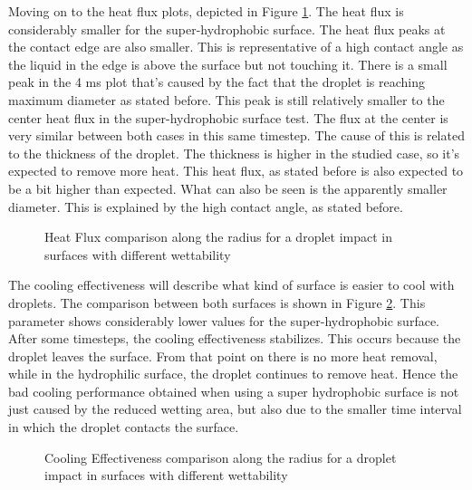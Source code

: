 \par Moving on to the heat flux plots, depicted in Figure \ref{fig:shfflux}. The heat flux is considerably smaller for the super-hydrophobic surface. The heat flux peaks at the contact edge are also smaller. This is representative of a high contact angle as the liquid in the edge is above the surface but not touching it. There is a small peak in the 4 ms plot that's caused by the fact that the droplet is reaching maximum diameter as stated before. This peak is still relatively smaller to the center heat flux in the super-hydrophobic surface test. The flux at the center is very similar between both cases in this same timestep. The cause of this is related to the thickness of the droplet. The thickness is higher in the studied case, so it's expected to remove more heat. This heat flux, as stated before is also expected to be a bit higher than expected. What can also be seen is the apparently smaller diameter. This is explained by the high contact angle, as stated before.\\

\begin{figure}[h]
\centering
\subfigure[2 ms]{}
\subfigure[4 ms]{}
\caption{Heat Flux comparison along the radius for a droplet impact in surfaces with different wettability}
\label{fig:shfflux}
\end{figure}

\par The cooling effectiveness will describe what kind of surface is easier to cool with droplets. The comparison between both surfaces is shown in Figure \ref{fig:shfcool}. This parameter shows considerably lower values for the super-hydrophobic surface. After some timesteps, the cooling effectiveness stabilizes. This occurs because the droplet leaves the surface. From that point on there is no more heat removal, while in the hydrophilic surface, the droplet continues to remove heat. Hence the bad cooling performance obtained when using a super hydrophobic surface is not just caused by the reduced wetting area, but also due to the smaller time interval in which the droplet contacts the surface.

\begin{figure}[h]
\centering

\caption{Cooling Effectiveness comparison along the radius for a droplet impact in surfaces with different wettability}
\label{fig:shfcool}
\end{figure}